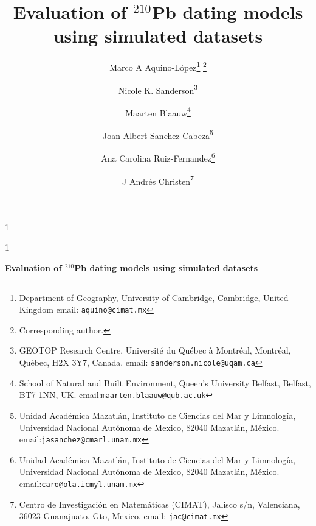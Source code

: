 \documentclass [10pt] {article}
\date{ }
\newcommand{\blind}{1}
\newcommand{\papertitle}{
	Evaluation of $^{210}$Pb dating models using simulated datasets
}
\begin{document}
	\def\spacingset#1{\renewcommand{\baselinestretch}%
		{#1}\small\normalsize} \spacingset{1}
	\blind
	{
		\title{\textbf{\papertitle}}

		\author{Marco A Aquino-L\'opez\thanks{
				Department of Geography, University of Cambridge, 
				Cambridge, United Kingdom
				email: \texttt{aquino@cimat.mx} } \thanks{Corresponding author.}
					\and
			Nicole K. Sanderson\thanks{
				GEOTOP Research Centre, Université du Québec à Montréal, 
				Montréal, Québec, H2X 3Y7, Canada. 
				email: \texttt{sanderson.nicole@uqam.ca}}
					\and
			Maarten Blaauw\thanks{School of Natural and Built Environment,
				Queen's University Belfast,
				Belfast, BT7-1NN, UK.
				email:\texttt{maarten.blaauw@qub.ac.uk}  }
					\and
			Joan-Albert Sanchez-Cabeza\thanks{
				Unidad Acad\'emica Mazatl\'an, 
				Instituto de Ciencias del Mar y Limnolog\'ia, 
				Universidad Nacional Aut\'onoma de Mexico, 
				82040 Mazatl\'an, M\'exico.
				email:\texttt{jasanchez@cmarl.unam.mx}} 
					\and
			Ana Carolina Ruiz-Fernandez\thanks{
				Unidad Acad\'emica Mazatl\'an, 
				Instituto de Ciencias del Mar y Limnolog\'ia, 
				Universidad Nacional Aut\'onoma de Mexico, 
				82040 Mazatl\'an, M\'exico.
				email:\texttt{caro@ola.icmyl.unam.mx}} 
					\and
			J Andr\'es Christen\thanks{
				Centro de Investigaci\'on en Matem\'aticas (CIMAT),
				Jalisco s/n, Valenciana, 36023 Guanajuato, Gto, Mexico.
				email: \texttt{jac@cimat.mx}  }
			}
		\maketitle
	} \fi

	\blind
	{
		\bigskip
		\bigskip
		\bigskip
		\begin{center}
			{\LARGE\bf \papertitle}
		\end{center}
		\medskip
	} \fi
\bigskip
\end{document}
